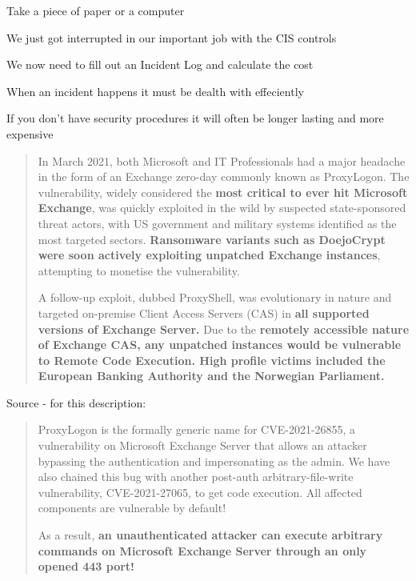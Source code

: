 \documentclass[Screen16to9,17pt]{foils}
\begin{document}

Take a piece of paper or a computer
\begin{list2}
\item We just got interrupted in our important job with the CIS controls
\item We now need to fill out an Incident Log and calculate the cost
\item When an incident happens it must be dealth with effeciently
\item If you don't have security procedures it will often be longer lasting and more expensive
\end{list2}

\begin{quote}
In March 2021, both Microsoft and IT Professionals had a major headache in the form of an Exchange zero-day commonly known as ProxyLogon. The vulnerability, widely considered the {\bf most critical to ever hit Microsoft Exchange}, was quickly exploited in the wild by suspected state-sponsored threat actors, with US government and military systems identified as the most targeted sectors. {\bf Ransomware variants such as DoejoCrypt were soon actively exploiting unpatched Exchange instances}, attempting to monetise the vulnerability.

A follow-up exploit, dubbed ProxyShell, was evolutionary in nature and targeted on-premise Client Access Servers (CAS) in {\bf all supported versions of Exchange Server.} Due to the {\bf remotely accessible nature of Exchange CAS, any unpatched instances would be vulnerable to Remote Code Execution. High profile victims included the European Banking Authority and the Norwegian Parliament.}
\end{quote}
Source - for this description:\\



\begin{quote}
ProxyLogon is the formally generic name for CVE-2021-26855, a vulnerability on Microsoft Exchange Server that allows an attacker bypassing the authentication and impersonating as the admin. We have also chained this bug with another post-auth arbitrary-file-write vulnerability, CVE-2021-27065, to get code execution. All affected components are vulnerable by default!

As a result, {\bf an unauthenticated attacker can execute arbitrary commands on Microsoft Exchange Server through an only opened 443 port!}
\end{quote}
\end{document}
